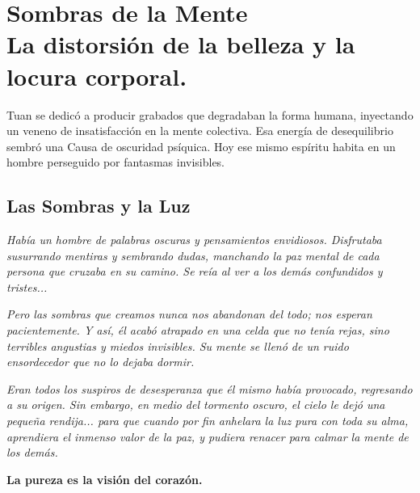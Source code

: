 \chapter[Sombras de la Mente]{Sombras de la Mente\\ \large La distorsión de la belleza y la locura corporal.}


\lettrine[lines=3, nindent=0.5em, findent=0.2em]{T}{}uan se dedicó a producir grabados que degradaban la forma humana, inyectando un veneno de insatisfacción en la mente colectiva. Esa energía de desequilibrio sembró una Causa de oscuridad psíquica. Hoy ese mismo espíritu habita en un hombre perseguido por fantasmas invisibles.

\section{Las Sombras y la Luz}
\begin{elegantquote}
\textit{Había un hombre de palabras oscuras y pensamientos envidiosos. Disfrutaba susurrando mentiras y sembrando dudas, manchando la paz mental de cada persona que cruzaba en su camino. Se reía al ver a los demás confundidos y tristes...}

\textit{Pero las sombras que creamos nunca nos abandonan del todo; nos esperan pacientemente. Y así, él acabó atrapado en una celda que no tenía rejas, sino terribles angustias y miedos invisibles. Su mente se llenó de un ruido ensordecedor que no lo dejaba dormir.}

\textit{Eran todos los suspiros de desesperanza que él mismo había provocado, regresando a su origen. Sin embargo, en medio del tormento oscuro, el cielo le dejó una pequeña rendija... para que cuando por fin anhelara la luz pura con toda su alma, aprendiera el inmenso valor de la paz, y pudiera renacer para calmar la mente de los demás.}

\end{elegantquote}

\vspace{1em}
\begin{center}
    \textbf{\Large La pureza es la visión del corazón.}
\end{center}
\vspace{1em}

